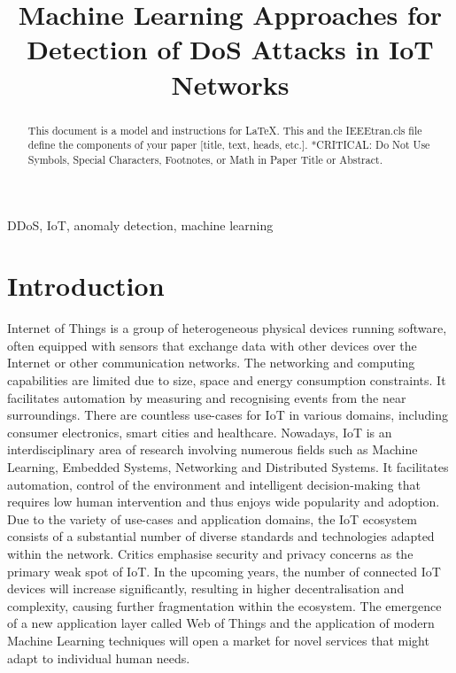 \documentclass[conference]{IEEEtran}
\begin{document}
\title{Machine Learning Approaches for Detection of DoS Attacks in IoT Networks\\}

\author{
}

\maketitle

\begin{abstract}
This document is a model and instructions for \LaTeX.
This and the IEEEtran.cls file define the components of your paper [title, text, heads, etc.]. *CRITICAL: Do Not Use Symbols, Special Characters, Footnotes, 
or Math in Paper Title or Abstract.
\end{abstract}

\begin{IEEEkeywords}
DDoS, IoT, anomaly detection, machine learning
\end{IEEEkeywords}

\section{Introduction}
Internet of Things is a group of heterogeneous physical devices running software, often equipped with sensors that exchange data with other devices over the Internet or other communication networks.
The networking and computing capabilities are limited due to size, space and energy consumption constraints.
It facilitates automation by measuring and recognising events from the near surroundings.
There are countless use-cases for IoT in various domains, including consumer electronics, smart cities and healthcare.
Nowadays, IoT is an interdisciplinary area of research involving numerous fields such as Machine Learning, Embedded Systems, Networking and Distributed Systems.
It facilitates automation, control of the environment and intelligent decision-making that requires low human intervention and thus enjoys wide popularity and adoption.
Due to the variety of use-cases and application domains, the IoT ecosystem consists of a substantial number of diverse standards and technologies adapted within the network.
Critics emphasise security and privacy concerns as the primary weak spot of IoT.
In the upcoming years, the number of connected IoT devices will increase significantly, resulting in higher decentralisation and complexity, causing further fragmentation within the ecosystem.
The emergence of a new application layer called Web of Things and the application of modern Machine Learning techniques will open a market for novel services that might adapt to individual human needs.
\end{document}
